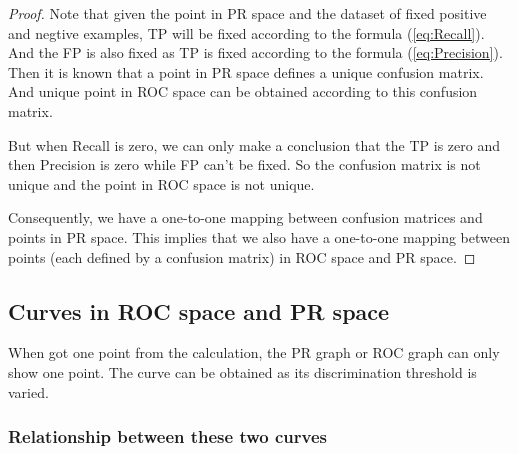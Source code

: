 \documentclass[a4paper,12pt]{article}
\begin{document}
\begin{proof} Note that given the point in PR space and the dataset of fixed positive and negtive examples, TP will be fixed according to the formula (\ref{eq:Recall}). And the FP is also fixed as TP is fixed according to the formula (\ref{eq:Precision}). Then it is known that a point in PR space defines a unique confusion matrix. And unique point in ROC space can be obtained according to this confusion matrix.

But when Recall is zero, we can only make a conclusion that the TP is zero and then Precision is zero while FP can't be fixed. So the confusion matrix is not unique and the point in ROC space is not unique.

Consequently, we have a one-to-one mapping between confusion matrices and points in PR space. This implies that we also have a one-to-one mapping between points (each defined by a confusion matrix) in ROC space and PR space.
\end{proof}

\subsection{Curves in ROC space and PR space}

When got one point from the calculation, the PR graph or ROC graph can only show one point. The curve can be obtained as its discrimination threshold is varied.

\subsubsection{Relationship between these two curves}
\end{document}
